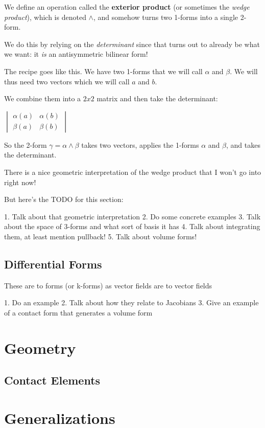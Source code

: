 \documentclass{article}
\begin{document}
We define an operation called the \textbf{exterior product} (or sometimes the
\textit{wedge product}), which is denoted $\wedge$, and somehow turns two
1-forms into a single 2-form.

We do this by relying on the \textit{determinant} since that turns out to
already be what we want: it \textit{is} an antisymmetric bilinear form!

The recipe goes like this. We have two 1-forms that we will call $\alpha$ and
$\beta$. We will thus need two vectors which we will call $a$ and $b$.

We combine them into a $2 x 2$ matrix and then take the determinant:

$
\begin{vmatrix}
  \alpha (a) & \alpha (b) \\
  \beta  (a) & \beta  (b)
\end{vmatrix}
$

So the 2-form $\gamma = \alpha \wedge \beta$ takes two vectors, applies the
1-forms $\alpha$ and $\beta$, and takes the determinant.

There is a nice geometric interpretation of the wedge product that I won't go
into right now!

But here's the TODO for this section:

1. Talk about that geometric interpretation
2. Do some concrete examples
3. Talk about the space of 3-forms and what sort of basis it has
4. Talk about integrating them, at least mention pullback!
5. Talk about volume forms!

\subsection {Differential Forms}

These are to forms (or k-forms) as vector fields are to vector fields

1. Do an example
2. Talk about how they relate to Jacobians
3. Give an example of a contact form that generates a volume form

\section {Geometry}

\subsection {Contact Elements}

\section {Generalizations}
\end{document}
